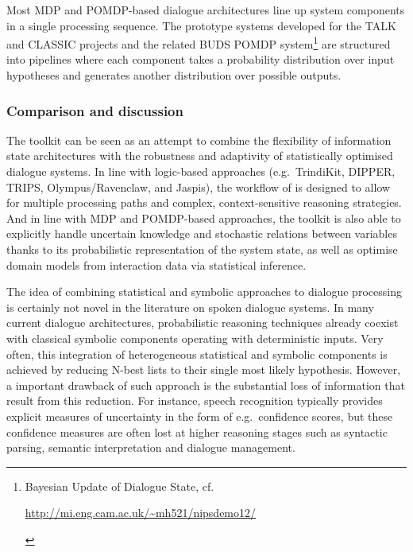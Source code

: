 Most MDP and POMDP-based dialogue architectures line up system components in a single processing sequence. The prototype systems developed for the TALK and CLASSIC projects \citep{Henderson:2008,Lemon:2012} and the related BUDS POMDP system\footnote{Bayesian Update of Dialogue State, cf. \begin{scriptsize}\url{http://mi.eng.cam.ac.uk/~mh521/nipsdemo12/}\end{scriptsize}} are structured into pipelines where each component takes a probability distribution over input hypotheses and generates another distribution over possible outputs.  



\subsubsection*{Comparison and discussion}

The \opendial{} toolkit can be seen as an attempt to combine the flexibility of information state architectures with the robustness and adaptivity of statistically optimised dialogue systems.  In line with logic-based approaches (e.g.\ TrindiKit, DIPPER, TRIPS, Olympus/Ravenclaw, and Jaspis), the workflow of \opendial{} is designed to allow for multiple processing paths and complex, context-sensitive reasoning strategies.  And in line with MDP and POMDP-based approaches, the toolkit is also able to explicitly handle uncertain knowledge and stochastic relations between variables thanks to its probabilistic representation of the system state, as well as optimise domain models from interaction data via statistical inference.  

The idea of combining statistical and symbolic approaches to dialogue processing is certainly not novel in the literature on spoken dialogue systems.  In many current dialogue architectures, probabilistic reasoning techniques already coexist with classical symbolic components operating with deterministic inputs. Very often, this integration of heterogeneous statistical and symbolic components is achieved by reducing N-best lists to their single most likely hypothesis. However, a important drawback of such approach is the substantial loss of information that result from this reduction. For instance, speech recognition typically provides explicit measures of uncertainty in the form of e.g.\ confidence scores, but these confidence measures are often lost at higher reasoning stages such as syntactic parsing, semantic interpretation and dialogue management. 

